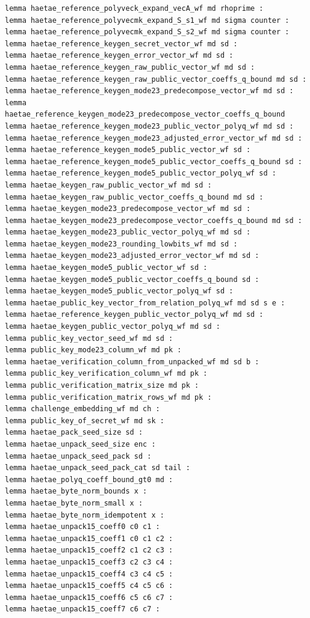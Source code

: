 \begin{lstlisting}[language=EasyCrypt,basicstyle=\ttfamily\tiny]
lemma haetae_reference_polyveck_expand_vecA_wf md rhoprime :
lemma haetae_reference_polyvecmk_expand_S_s1_wf md sigma counter :
lemma haetae_reference_polyvecmk_expand_S_s2_wf md sigma counter :
lemma haetae_reference_keygen_secret_vector_wf md sd :
lemma haetae_reference_keygen_error_vector_wf md sd :
lemma haetae_reference_keygen_raw_public_vector_wf md sd :
lemma haetae_reference_keygen_raw_public_vector_coeffs_q_bound md sd :
lemma haetae_reference_keygen_mode23_predecompose_vector_wf md sd :
lemma haetae_reference_keygen_mode23_predecompose_vector_coeffs_q_bound
lemma haetae_reference_keygen_mode23_public_vector_polyq_wf md sd :
lemma haetae_reference_keygen_mode23_adjusted_error_vector_wf md sd :
lemma haetae_reference_keygen_mode5_public_vector_wf sd :
lemma haetae_reference_keygen_mode5_public_vector_coeffs_q_bound sd :
lemma haetae_reference_keygen_mode5_public_vector_polyq_wf sd :
lemma haetae_keygen_raw_public_vector_wf md sd :
lemma haetae_keygen_raw_public_vector_coeffs_q_bound md sd :
lemma haetae_keygen_mode23_predecompose_vector_wf md sd :
lemma haetae_keygen_mode23_predecompose_vector_coeffs_q_bound md sd :
lemma haetae_keygen_mode23_public_vector_polyq_wf md sd :
lemma haetae_keygen_mode23_rounding_lowbits_wf md sd :
lemma haetae_keygen_mode23_adjusted_error_vector_wf md sd :
lemma haetae_keygen_mode5_public_vector_wf sd :
lemma haetae_keygen_mode5_public_vector_coeffs_q_bound sd :
lemma haetae_keygen_mode5_public_vector_polyq_wf sd :
lemma haetae_public_key_vector_from_relation_polyq_wf md sd s e :
lemma haetae_reference_keygen_public_vector_polyq_wf md sd :
lemma haetae_keygen_public_vector_polyq_wf md sd :
lemma public_key_vector_seed_wf md sd :
lemma public_key_mode23_column_wf md pk :
lemma haetae_verification_column_from_unpacked_wf md sd b :
lemma public_key_verification_column_wf md pk :
lemma public_verification_matrix_size md pk :
lemma public_verification_matrix_rows_wf md pk :
lemma challenge_embedding_wf md ch :
lemma public_key_of_secret_wf md sk :
lemma haetae_pack_seed_size sd :
lemma haetae_unpack_seed_size enc :
lemma haetae_unpack_seed_pack sd :
lemma haetae_unpack_seed_pack_cat sd tail :
lemma haetae_polyq_coeff_bound_gt0 md :
lemma haetae_byte_norm_bounds x :
lemma haetae_byte_norm_small x :
lemma haetae_byte_norm_idempotent x :
lemma haetae_unpack15_coeff0 c0 c1 :
lemma haetae_unpack15_coeff1 c0 c1 c2 :
lemma haetae_unpack15_coeff2 c1 c2 c3 :
lemma haetae_unpack15_coeff3 c2 c3 c4 :
lemma haetae_unpack15_coeff4 c3 c4 c5 :
lemma haetae_unpack15_coeff5 c4 c5 c6 :
lemma haetae_unpack15_coeff6 c5 c6 c7 :
lemma haetae_unpack15_coeff7 c6 c7 :

\end{lstlisting}

